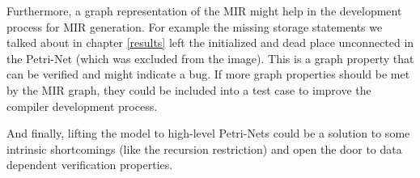 Furthermore, a graph representation of the MIR might help in the development process for MIR generation.
For example the missing storage statements we talked about in chapter \ref{results} left the initialized and dead place unconnected in the Petri-Net (which was excluded from the image).
This is a graph property that can be verified and might indicate a bug.
If more graph properties should be met by the MIR graph, they could be included into a test case to improve the compiler development process.

And finally, lifting the model to high-level Petri-Nets could be a solution to some intrinsic shortcomings (like the recursion restriction) and open the door to data dependent verification properties.
